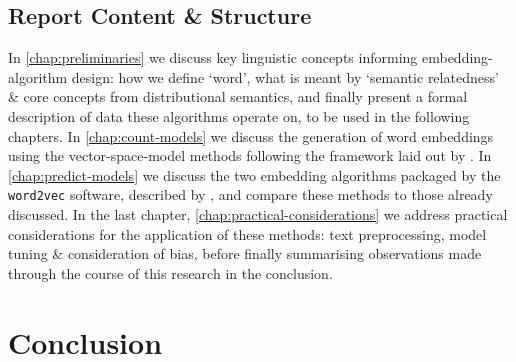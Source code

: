\documentclass{ucetd}
\begin{document}
\section{Report Content \& Structure}
In \autoref{chap:preliminaries} we discuss key linguistic concepts informing embedding-algorithm design: how we define `word', what is meant by `semantic relatedness' \& core concepts from distributional semantics, and finally present a formal description of data these algorithms operate on, to be used in the following chapters. In \autoref{chap:count-models} we discuss the generation of word embeddings using the vector-space-model methods following the framework laid out by \textcite{turney10-from-frequen-to-meanin}. In \autoref{chap:predict-models} we discuss the two embedding algorithms packaged by the \texttt{word2vec} software, described by \textcite{mikolov13-distr-repres-words-phras-their-compos}, and compare these methods to those already discussed. In the last chapter, \autoref{chap:practical-considerations} we address practical considerations for the application of these methods: text preprocessing, model tuning \& consideration of bias, before finally summarising observations made through the course of this research in the conclusion.





\chapter*{Conclusion}\label{chap:conclusion}
\makebibliography
\end{document}
